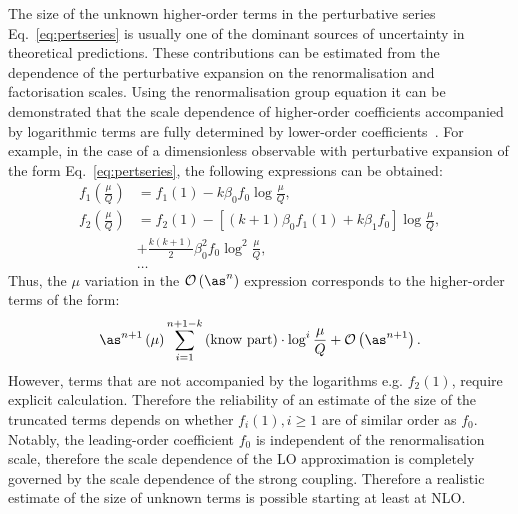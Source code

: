 The size of the unknown higher-order terms in the perturbative series Eq.~\eqref{eq:pertseries} is usually one of the dominant sources of uncertainty in theoretical predictions. These contributions can be estimated from the dependence of the perturbative expansion on the renormalisation and factorisation scales. Using the renormalisation group equation it can be demonstrated that the scale dependence of higher-order coefficients accompanied by logarithmic terms are fully determined by lower-order coefficients~\cite{Behnke:2013pga}. For example, in the case of a dimensionless observable with perturbative expansion of the form Eq.~\eqref{eq:pertseries}, the following expressions can be obtained:
\begin{align}
	f_1\left(\frac{\mu}{Q}\right) &= f_1\left(1\right) - k\beta_0f_0\log{\frac{\mu}{Q}}, \\
	f_2\left(\frac{\mu}{Q}\right) &= f_2\left(1\right) - \left[\left(k+1\right)\beta_0f_1\left(1\right) + k\beta_1f_0\right]\log{\frac{\mu}{Q}}, \\
																						&+ \frac{k\left(k+1\right)}{2}\beta_0^2f_0\log^2{\frac{\mu}{Q}},\\
																						& \ldots 
\end{align}
Thus, the $\mu$ variation in the $\mathcal{O}\left(\as^n\right)$ expression corresponds to the higher-order terms of the form:
\begin{equation}
 \as^{n+1}\left(\mu\right) \sum_{i=1}^{n+1-k}{\text{(know part)}\cdot\log^i{\frac{\mu}{Q}}} + \mathcal{O}\left(\as^{n+1}\right).
\label{eq:scalevariationerror}
\end{equation}
However, terms that are not accompanied by the logarithms e.g. $f_2\left(1\right)$, require explicit calculation. Therefore the reliability of an estimate of the size of the truncated terms depends on whether $f_i\left(1\right), i \ge 1$ are of similar order as $f_0$. Notably,
the leading-order coefficient $f_0$ is independent of the renormalisation scale, therefore the scale dependence of the LO approximation is completely governed by the scale dependence of the strong coupling. Therefore a realistic estimate of the size of unknown terms is possible starting at least at NLO.

